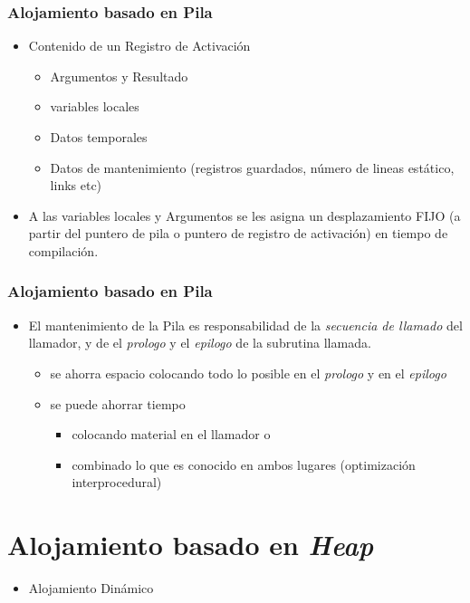 \documentclass[11pt]{article}
\begin{document}
\subsubsection*{Alojamiento basado en Pila}
\label{sec:orge62f548}
\begin{itemize}
\item Contenido de un Registro de Activación
\begin{itemize}
\item Argumentos y Resultado
\item variables locales
\item Datos temporales
\item Datos de mantenimiento (registros guardados, número de lineas
estático, links etc)
\end{itemize}
\item A las variables locales y Argumentos se les asigna un desplazamiento
FIJO (a partir del puntero de pila o puntero de registro de
activación) en tiempo de compilación.
\end{itemize}

\subsubsection*{Alojamiento basado en Pila}
\label{sec:org7bef60c}
\begin{itemize}
\item El mantenimiento de la Pila es responsabilidad de la \emph{secuencia de
llamado} del llamador, y de el \emph{prologo} y el \emph{epilogo} de la
subrutina llamada.
\begin{itemize}
\item se ahorra espacio colocando todo lo posible en el \emph{prologo} y en
el \emph{epilogo}
\item se puede ahorrar tiempo
\begin{itemize}
\item colocando material en el llamador  o
\item combinado lo que es conocido en ambos lugares (optimización interprocedural)
\end{itemize}
\end{itemize}
\end{itemize}

\section*{Alojamiento basado en \emph{Heap}}
\label{sec:org6e8af8f}
\begin{itemize}
\item Alojamiento Dinámico
\end{itemize}
\end{document}
